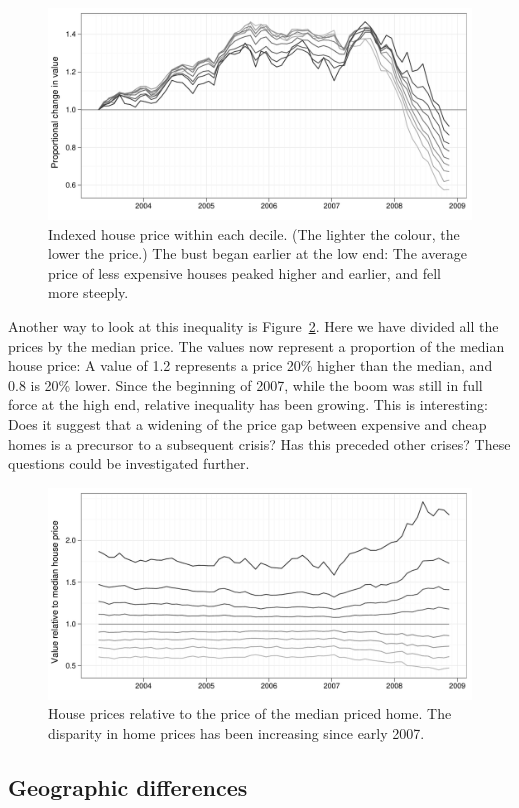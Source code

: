 \documentclass[oneside]{article}
\begin{document}
\begin{figure}[htbp]
  \centering
  \includegraphics[width=0.75\linewidth]{decile-ind}
  \caption{Indexed house price within each decile. (The lighter the colour, the lower the price.)  The bust began earlier at the low end: The average price of less expensive houses peaked higher and earlier, and fell more steeply.}
  \label{fig:decile-ind}
\end{figure}

Another way to look at this inequality is Figure~\ref{fig:decile-rel}.  Here we have divided all the prices by the median price.  The values now represent a proportion of the median house price: A value of 1.2 represents a price 20\% higher than the median, and 0.8 is 20\% lower. Since the beginning of 2007, while the boom was still in full force at the high end, relative inequality has been growing.  This is interesting: Does it suggest that a widening of the price gap between expensive and cheap homes is a precursor to a subsequent crisis? Has this preceded other crises? These questions could be investigated further.

\begin{figure}[htbp]
  \centering
  \includegraphics[width=0.75\linewidth]{decile-rel}
  \caption{House prices relative to the price of the median priced home.  The disparity in home prices has been increasing since early 2007.}
  \label{fig:decile-rel}
\end{figure}

\subsection{Geographic differences}
\end{document}
